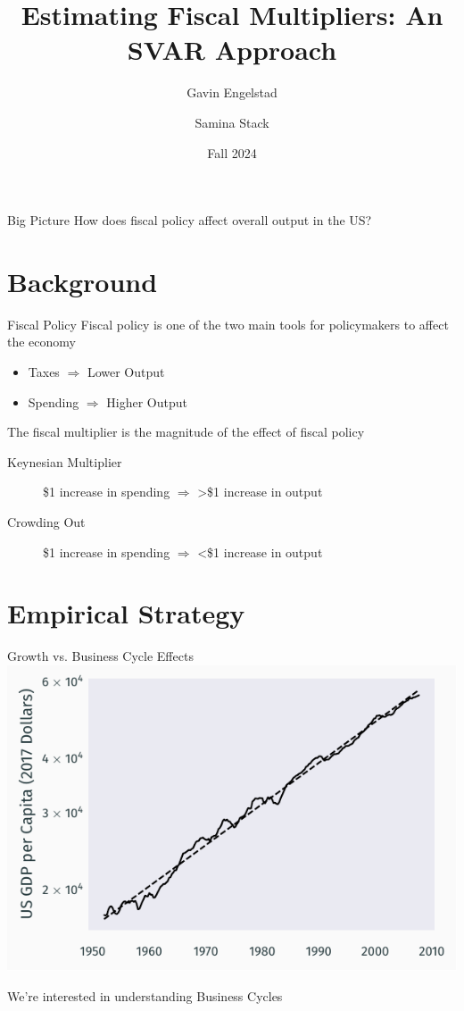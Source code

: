 \documentclass{beamer}
\title{Estimating Fiscal Multipliers: An SVAR Approach}
\author{Gavin Engelstad \and Samina Stack}
\date{Fall 2024}
\institute{Stat 451: Causal Inference}
\begin{document}
\maketitle

\begin{frame}{Big Picture}
    \centering
    How does \alert{fiscal policy} affect overall \alert{output} in the US?
\end{frame}


\section{Background}

\begin{frame}{Fiscal Policy}
    \alert{Fiscal policy} is one of the two main tools for policymakers to affect the economy
    \begin{itemize}
        \item Taxes $\Rightarrow$ Lower Output {\scriptsize \parencite{barro2011macroeconomic}}
        \item Spending $\Rightarrow$ Higher Output {\scriptsize \parencite{blanchard2013growth}}
    \end{itemize}

    The \alert{fiscal multiplier} is the magnitude of the effect of fiscal policy
    \begin{description}
        \item[Keynesian Multiplier] \$1 increase in spending $\Rightarrow$ >\$1 increase in output {\scriptsize \parencite{barro2011macroeconomic}}
        \item[Crowding Out] \$1 increase in spending $\Rightarrow$ <\$1 increase in output {\scriptsize \parencite{baum2012fiscal}}
    \end{description}
\end{frame}


\section{Empirical Strategy}

\begin{frame}{Growth vs. Business Cycle Effects} 
    \centering
    \includegraphics{figures/growth_effects.pdf}

    We're interested in understanding \alert{Business Cycles}
\end{frame}
\end{document}
